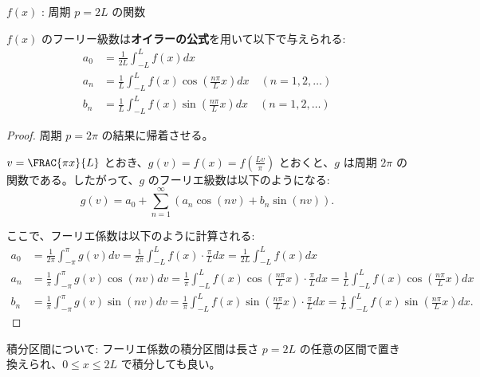 \documentclass[article,paper=a4paper]{jlreq}
\begin{document}
\begin{prop}
    \quad $f(x)$ : 周期 $p=2L$ の関数\par
    $f(x)$ のフーリー級数は\textbf{オイラーの公式}を用いて以下で与えられる:
    \begin{align*}
        a_0 &= \frac{1}{2L} \int_{-L}^{L} f(x) dx \\
        a_n &= \frac{1}{L} \int_{-L}^{L} f(x) \cos \left( \frac{n\pi}{L}x \right) dx \quad (n = 1, 2, \ldots) \\
        b_n &= \frac{1}{L} \int_{-L}^{L} f(x) \sin \left( \frac{n\pi}{L}x \right) dx  \quad (n = 1, 2, \ldots)
    \end{align*}
\end{prop}

\begin{proof}
    周期 $p=2\pi$ の結果に帰着させる。

    $v=\FRAC{\pi x}{L}$ とおき、$g(v) = f(x) = f\left( \frac{Lv}{\pi} \right)$ とおくと、$g$ は周期 $2\pi$ の関数である。したがって、$g$ のフーリエ級数は以下のようになる:
    \[g(v) = a_0 + \sum_{n=1}^{\infty}\left(a_{n}\cos\left(nv\right) + b_{n}\sin\left(nv\right) \right).\]

    ここで、フーリエ係数は以下のように計算される:
    \begin{align*}
        a_0 &= \frac{1}{2\pi} \int_{-\pi}^{\pi} g(v) dv = \frac{1}{2\pi} \int_{-L}^{L} f(x) \cdot \frac{\pi}{L} dx = \frac{1}{2L} \int_{-L}^{L} f(x) dx \\
        a_n &= \frac{1}{\pi} \int_{-\pi}^{\pi} g(v) \cos (nv) dv = \frac{1}{\pi} \int_{-L}^{L} f(x) \cos \left( \frac{n\pi}{L}x \right) \cdot \frac{\pi}{L} dx = \frac{1}{L} \int_{-L}^{L} f(x) \cos \left( \frac{n\pi}{L}x \right) dx \\
        b_n &= \frac{1}{\pi} \int_{-\pi}^{\pi} g(v) \sin (nv) dv = \frac{1}{\pi} \int_{-L}^{L} f(x) \sin \left( \frac{n\pi}{L}x \right) \cdot \frac{\pi}{L} dx = \frac{1}{L} \int_{-L}^{L} f(x) \sin \left( \frac{n\pi}{L}x \right) dx.
    \end{align*}
\end{proof}

\begin{rem}
積分区間について: フーリエ係数の積分区間は長さ $p=2L$ の任意の区間で置き換えられ、$0 \leq x \leq 2L$ で積分しても良い。
\end{rem}
\end{document}
